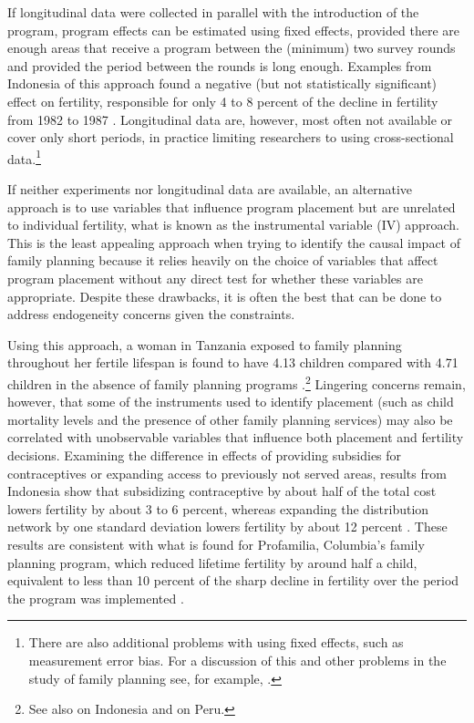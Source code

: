If longitudinal data were collected in parallel with the introduction of the program, program effects can be estimated using fixed effects, provided there are enough areas that receive a program between the (minimum) two survey rounds and provided the period between the rounds is long enough. Examples from Indonesia of this approach found a negative (but not statistically significant) effect on fertility, responsible for only 4 to 8 percent of the decline in fertility from 1982 to 1987 \citep{pitt93,Gertler1994}. Longitudinal data are, however, most often not available or cover only short periods, in practice limiting researchers to using cross-sectional data.\footnote{There are also additional problems with using fixed effects, such as measurement error bias. For a discussion of this and other problems in the study of family planning see, for example, \cite{angeles98}.}

If neither experiments nor longitudinal data are available, an alternative approach is to use variables that influence program placement but are unrelated to individual fertility, what is known as the instrumental variable (IV) approach. This is the least appealing approach when trying to identify the causal impact of family planning because it relies heavily on the choice of variables that affect program placement without any direct test for whether these variables are appropriate. Despite these drawbacks, it is often the best that can be done to address endogeneity concerns given the constraints.

Using this approach, a woman in Tanzania exposed to family planning throughout her fertile lifespan is found to have 4.13 children compared with 4.71 children in the absence of family planning programs \citep{angeles98}.\footnote{See also \citet{Angeles2005} on Indonesia and \citep{Angeles2005a} on Peru.} Lingering concerns remain, however, that some of the instruments used to identify placement (such as child mortality levels and the presence of other family planning services) may also be correlated with unobservable variables that influence both placement and fertility decisions. Examining the difference in effects of providing subsidies for contraceptives or expanding access to previously not served areas, results from Indonesia show that subsidizing contraceptive by about half of the total cost lowers fertility by about 3 to 6 percent, whereas expanding the distribution network by one standard deviation lowers fertility by about 12 percent \citep{Molyneaux2000}. These results are consistent with what is found for Profamilia, Columbia's family planning program, which reduced lifetime fertility by around half a child, equivalent to less than 10 percent of the sharp decline in fertility over the period the program was implemented \citep{Miller2010}.

